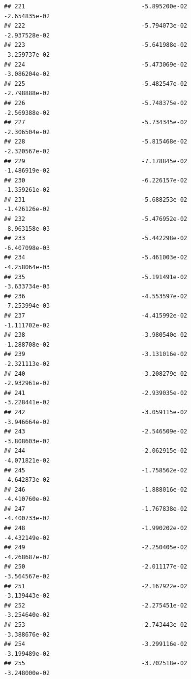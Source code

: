 \documentclass[
]{article}
\begin{document}
\begin{verbatim}
## 221                                 -5.895200e-02          -2.654835e-02
## 222                                 -5.794073e-02          -2.937528e-02
## 223                                 -5.641988e-02          -3.259737e-02
## 224                                 -5.473069e-02          -3.086204e-02
## 225                                 -5.482547e-02          -2.798888e-02
## 226                                 -5.748375e-02          -2.569388e-02
## 227                                 -5.734345e-02          -2.306504e-02
## 228                                 -5.815468e-02          -2.320567e-02
## 229                                 -7.178845e-02          -1.486919e-02
## 230                                 -6.226157e-02          -1.359261e-02
## 231                                 -5.688253e-02          -1.426126e-02
## 232                                 -5.476952e-02          -8.963158e-03
## 233                                 -5.442298e-02          -6.407098e-03
## 234                                 -5.461003e-02          -4.258064e-03
## 235                                 -5.191491e-02          -3.633734e-03
## 236                                 -4.553597e-02          -7.253994e-03
## 237                                 -4.415992e-02          -1.111702e-02
## 238                                 -3.980540e-02          -1.288708e-02
## 239                                 -3.131016e-02          -2.321113e-02
## 240                                 -3.208279e-02          -2.932961e-02
## 241                                 -2.939035e-02          -3.228441e-02
## 242                                 -3.059115e-02          -3.946664e-02
## 243                                 -2.546509e-02          -3.808603e-02
## 244                                 -2.062915e-02          -4.071821e-02
## 245                                 -1.758562e-02          -4.642873e-02
## 246                                 -1.888016e-02          -4.410760e-02
## 247                                 -1.767838e-02          -4.400733e-02
## 248                                 -1.990202e-02          -4.432149e-02
## 249                                 -2.250405e-02          -4.268687e-02
## 250                                 -2.011177e-02          -3.564567e-02
## 251                                 -2.167922e-02          -3.139443e-02
## 252                                 -2.275451e-02          -3.254640e-02
## 253                                 -2.743443e-02          -3.388676e-02
## 254                                 -3.299116e-02          -3.199489e-02
## 255                                 -3.702518e-02          -3.248000e-02

\end{verbatim}
\end{document}
